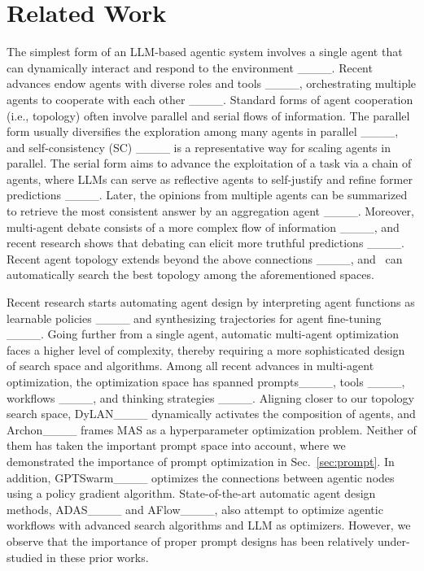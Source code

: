 \section{Related Work}
The simplest form of an LLM-based agentic system involves a single agent that can dynamically interact and respond to the environment ____. Recent advances endow agents with diverse roles and tools ____, orchestrating multiple agents to cooperate with each other ____.
Standard forms of agent cooperation (i.e., topology) often involve parallel and serial flows of information. The parallel form usually diversifies the exploration among many agents in parallel ____, and self-consistency (SC) ____ is a representative way for scaling agents in parallel. The serial form aims to advance the exploitation of a task via a chain of agents, where LLMs can serve as reflective agents to self-justify and refine former predictions ____. Later, the opinions from multiple agents can be summarized to retrieve the most consistent answer by an aggregation agent ____. Moreover, multi-agent debate consists of a more complex flow of information ____, and recent research shows that debating can elicit more truthful predictions ____. Recent agent topology extends beyond the above connections ____, and \ours~can automatically search the best topology among the aforementioned spaces. 

Recent research starts automating agent design by interpreting agent functions as learnable policies ____ and synthesizing trajectories for agent fine-tuning ____. 
Going further from a single agent, automatic multi-agent optimization faces a higher level of complexity, thereby requiring a more sophisticated design of search space and algorithms. Among all recent advances in multi-agent optimization, the optimization space has spanned prompts____, tools ____, workflows ____, and thinking strategies ____. Aligning closer to our topology search space, DyLAN____ dynamically activates the composition of agents, and Archon____ frames MAS as a hyperparameter optimization problem. Neither of them has taken the important prompt space into account, where we demonstrated the importance of prompt optimization in Sec.~\ref{sec:prompt}. In addition, 
GPTSwarm____ optimizes the connections between agentic nodes using a policy gradient algorithm. 
State-of-the-art automatic agent design methods, ADAS____ and AFlow____, also attempt to optimize agentic workflows with advanced search algorithms and LLM as optimizers. However, we observe that the importance of proper prompt designs has been relatively under-studied in these prior works.